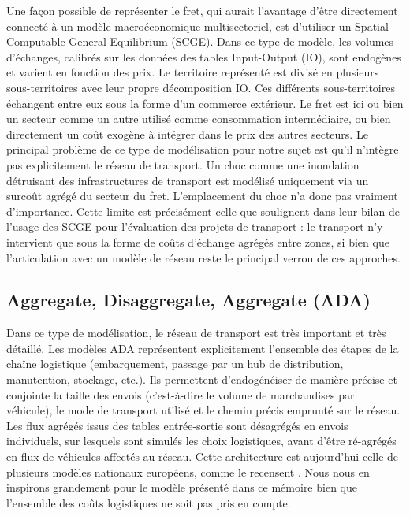 \documentclass[12pt,a4paper,french]{report}
\begin{document}
	Une façon possible de représenter le fret, qui aurait l'avantage d'être directement connecté à un modèle macroéconomique multisectoriel, est d'utiliser un Spatial Computable General Equilibrium (SCGE). Dans ce type de modèle, les volumes d'échanges, calibrés sur les données des tables Input-Output (IO), sont endogènes et varient en fonction des prix. Le territoire représenté est divisé en plusieurs sous-territoires avec leur propre décomposition IO. Ces différents sous-territoires échangent entre eux sous la forme d'un commerce extérieur. Le fret est ici ou bien un secteur comme un autre utilisé comme consommation intermédiaire, ou bien directement un coût exogène à intégrer dans le prix des autres secteurs. Le principal problème de ce type de modélisation pour notre sujet est qu'il n'intègre pas explicitement le réseau de transport. Un choc comme une inondation détruisant des infrastructures de transport est modélisé uniquement via un surcoût agrégé du secteur du fret. L'emplacement du choc n'a donc pas vraiment d'importance. Cette limite est précisément celle que soulignent \cite{Tavasszy2011} dans leur bilan de l'usage des SCGE pour l'évaluation des projets de transport : le transport n'y intervient que sous la forme de coûts d'échange agrégés entre zones, si bien que l'articulation avec un modèle de réseau reste le principal verrou de ces approches.
	
	\subsection {Aggregate, Disaggregate, Aggregate (ADA)}
	\label{subsec:ADA}
	
	Dans ce type de modélisation, le réseau de transport est très important et très détaillé. Les modèles ADA représentent explicitement l'ensemble des étapes de la chaîne logistique (embarquement, passage par un hub de distribution, manutention, stockage, etc.). Ils permettent d'endogénéiser de manière précise et conjointe la taille des envois (c'est-à-dire le volume de marchandises par véhicule), le mode de transport utilisé et le chemin précis emprunté sur le réseau. Les flux agrégés issus des tables entrée-sortie sont désagrégés en envois individuels, sur lesquels sont simulés les choix logistiques, avant d'être ré-agrégés en flux de véhicules affectés au réseau. Cette architecture est aujourd'hui celle de plusieurs modèles nationaux européens, comme le recensent \cite{deJong2013}. Nous nous en inspirons grandement pour le modèle présenté dans ce mémoire bien que l'ensemble des coûts logistiques ne soit pas pris en compte.
	
\end{document}
